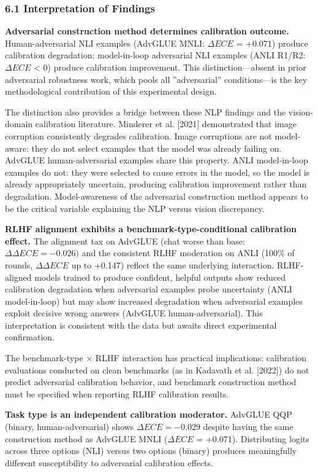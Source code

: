
\subsubsection{6.1 Interpretation of Findings}

\textbf{Adversarial construction method determines calibration outcome.} Human-adversarial NLI examples (AdvGLUE MNLI: $\Delta ECE$ = +0.071) produce calibration degradation; model-in-loop adversarial NLI examples (ANLI R1/R2: $\Delta ECE$ < 0) produce calibration improvement. This distinction---absent in prior adversarial robustness work, which pools all ''adversarial'' conditions---is the key methodological contribution of this experimental design.

The distinction also provides a bridge between these NLP findings and the vision-domain calibration literature. Minderer et al. [2021] demonstrated that image corruption consistently degrades calibration. Image corruptions are not model-aware: they do not select examples that the model was already failing on. AdvGLUE human-adversarial examples share this property. ANLI model-in-loop examples do not: they were selected to cause errors in the model, so the model is already appropriately uncertain, producing calibration improvement rather than degradation. Model-awareness of the adversarial construction method appears to be the critical variable explaining the NLP versus vision discrepancy.

\textbf{RLHF alignment exhibits a benchmark-type-conditional calibration effect.} The alignment tax on AdvGLUE (chat worse than base: $\Delta \Delta ECE = -0.026)$ and the consistent RLHF moderation on ANLI (100\% of rounds, $\Delta \Delta ECE$ up to +0.147) reflect the same underlying interaction. RLHF-aligned models trained to produce confident, helpful outputs show reduced calibration degradation when adversarial examples probe uncertainty (ANLI model-in-loop) but may show increased degradation when adversarial examples exploit decisive wrong answers (AdvGLUE human-adversarial). This interpretation is consistent with the data but awaits direct experimental confirmation.

The benchmark-type $\times$ RLHF interaction has practical implications: calibration evaluations conducted on clean benchmarks (as in Kadavath et al. [2022]) do not predict adversarial calibration behavior, and benchmark construction method must be specified when reporting RLHF calibration results.

\textbf{Task type is an independent calibration moderator.} AdvGLUE QQP (binary, human-adversarial) shows $\Delta ECE = -0.029$ despite having the same construction method as AdvGLUE MNLI ($\Delta ECE$ = +0.071). Distributing logits across three options (NLI) versus two options (binary) produces meaningfully different susceptibility to adversarial calibration effects.

